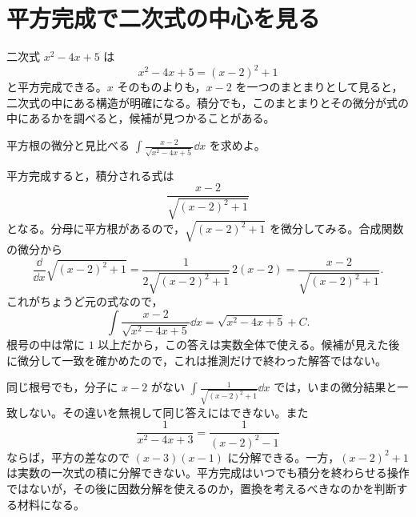 \section{平方完成で二次式の中心を見る}\label{節:平方完成と積分}

二次式 $x^2-4x+5$ は
\[
 x^2-4x+5=(x-2)^2+1
\]
と平方完成できる。$x$ そのものよりも，$x-2$ を一つのまとまりとして見ると，二次式の中にある構造が明確になる。積分でも，このまとまりとその微分が式の中にあるかを調べると，候補が見つかることがある。

\begin{example}{平方根の微分と見比べる}
$\int\frac{x-2}{\sqrt{x^2-4x+5}}\dd x$ を求めよ。
\end{example}

平方完成すると，積分される式は
\[
 \frac{x-2}{\sqrt{(x-2)^2+1}}
\]
となる。分母に平方根があるので，$\sqrt{(x-2)^2+1}$ を微分してみる。合成関数の微分から
\[
 \frac{\dd}{\dd x}\sqrt{(x-2)^2+1}
 =\frac1{2\sqrt{(x-2)^2+1}}\,2(x-2)
 =\frac{x-2}{\sqrt{(x-2)^2+1}}.
\]
これがちょうど元の式なので，
\[
 \int\frac{x-2}{\sqrt{x^2-4x+5}}\dd x
 =\sqrt{x^2-4x+5}+C.
\]
根号の中は常に $1$ 以上だから，この答えは実数全体で使える。候補が見えた後に微分して一致を確かめたので，これは推測だけで終わった解答ではない。

同じ根号でも，分子に $x-2$ がない $\int\frac1{\sqrt{(x-2)^2+1}}\dd x$ では，いまの微分結果と一致しない。その違いを無視して同じ答えにはできない。また
\[
 \frac1{x^2-4x+3}=\frac1{(x-2)^2-1}
\]
ならば，平方の差なので $(x-3)(x-1)$ に分解できる。一方，$(x-2)^2+1$ は実数の一次式の積に分解できない。平方完成はいつでも積分を終わらせる操作ではないが，その後に因数分解を使えるのか，置換を考えるべきなのかを判断する材料になる。

